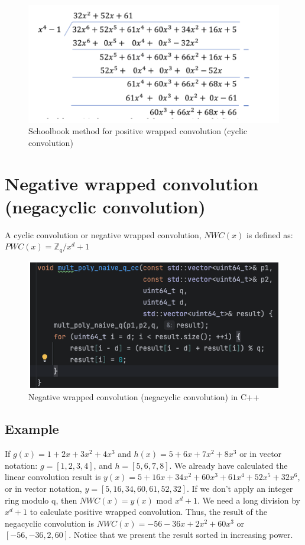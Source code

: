 \documentclass{techrep}
\theoremstyle{definition}
\theoremstyle{plain}
\newcommand{\Z}{\mathbb{Z}}
\begin{document}
\begin{figure}[H]
 	\centering
 	\includegraphics[width=.7\columnwidth]{fig/PWC_1.png}
 	\caption{Schoolbook method for positive wrapped convolution (cyclic convolution)} 
\label{fig:PWC_1}
\end{figure}

\section{Negative wrapped convolution (negacyclic convolution)}
A cyclic convolution or negative wrapped convolution, $NWC(x)$ is defined as: $PWC(x) = \Z_{q}/x^d + 1$  

\begin{figure}[H]
 	\centering
 	\includegraphics[width=.9\columnwidth]{fig/PWC_cplus.png}
 	\caption{Negative wrapped convolution (negacyclic convolution) in C++} 
\label{fig:PWC_cplus}
\end{figure}

\subsection{Example}
If $g(x) = 1 + 2x + 3x^2 + 4x^3$ and $h(x) = 5 + 6x + 7x^2 + 8x^3$ or in vector notation:  $g = [1, 2, 3, 4]$, and $h = [5, 6, 7, 8]$. We already have calculated the linear convolution result is $y(x) = 5 + 16x + 34x^2 + 60x^3 + 61x^4 + 52x^5 + 32x^6$, or in vector notation, $y = [5, 16, 34, 60, 61, 52, 32]$. If we don't apply an integer ring modulo q, then $NWC(x) = y(x)$ mod $x^d + 1$.  We need a long division by $x^d + 1$ to calculate positive wrapped convolution. Thus, the result of the negacyclic convolution is $NWC(x) = -56 -36x + 2x^2 + 60x^3$ or $[-56, -36, 2, 60]$. Notice that we present the result sorted in increasing power.
\end{document}
